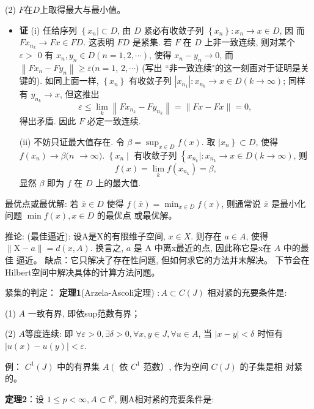 \documentclass[12pt,a4paper]{article}
\begin{document}
(2) $F$在$D$上取得最大与最小值。
\begin{itemize}
	\item []
	\textbf{证} (i) 任给序列 $\left\{x_{n} \mid \subset D\right.$, 由 $D$ 紧必有收敛子列 $\left\{x_{n}\right\}: x_{n} \rightarrow x \in D$, 因 而 $F x_{n_{k}} \rightarrow F x \in F D$. 这表明 $F D$ 是紧集. 若 $F$ 在 $D$ 上非一致连续, 则对某个 $\varepsilon>$ 0 有 $x_{n}, y_{n} \in D(n=1,2, \cdots)$, 使得 $x_{n}-y_{n} \rightarrow 0$, 而 $\left\|F x_{n}-F y_{n}\right\| \geqslant \varepsilon(n=1$, $2, \cdots)$ (写出 “非一致连续"的这一刻画对于证明是关键的). 如同上面一样, $\left\{x_{n}\right\}$ 有收敛子列 $\left|x_{n_{1}}\right|: x_{n_{k}} \rightarrow x \in D(k \rightarrow \infty)$; 同样有 $y_{n_{k}} \rightarrow x$, 但这推出
$$
\varepsilon \leqslant \lim _{k}\left\|F x_{n_{k}}-F y_{n_{k}}\right\|=\|F x-F x\|=0 \text {, }
$$
得出矛盾. 因此 $F$ 必定一致连续.

(ii) 不妨只证最大值存在. 令 $\beta=\sup _{x \in D} f(x)$. 取 $\left.\mid x_{n}\right\} \subset D$, 使得 $f\left(x_{n}\right) \rightarrow \beta(n$ $\rightarrow \infty)$. $\left\{x_{n} \mid\right.$ 有收敛子列 $\left\{x_{n_{k}} \mid: x_{n_{k}} \rightarrow x \in D(k \rightarrow \infty)\right.$, 则
$$
f(x)=\operatorname{lim}_{k}f\left(x_{n_{k}}\right)=\beta,
$$
显然 $\beta$ 即为 $f$ 在 $D$ 上的最大值.
\end{itemize}
 
 最优点或最优解: 若 $\bar{x} \in D$ 使得 $f(\bar{x})=\min _{x \in D} f(x)$, 则通常说 $\bar{x}$ 是最小化问题 $\min f(x), x \in D$ 的最优点 或最优解。
 
推论: (最佳逼近): 设A是X的有限维子空间, $x \in X$. 则存在 $a \in A$, 使得 $\|\mathrm{X}-a\|=d(x, A)$. 换言之, $a$ 是 $\mathrm{A}$ 中离x最近的点, 因此称它是x在 $A$ 中的最佳 逼近。 缺点：它只解决了存在性问题, 但如何求它的方法并末解决。 下节会在Hilbert空间中解决具体的计算方法问题。                  

紧集的判定：
\textbf{定理1}(Arzela-Ascoli定理) $: A \subset C(J)$ 相对紧的充要条件是:

(1) $A$ 一致有界, 即依sup范数有界；

(2) $A$等度连续: 即 $\forall \varepsilon>0, \exists \delta>0, \forall x, y \in J, \forall u \in A$, 当 $|x-y|<\delta$ 时恒有 $|u(x)-u(y)|<\varepsilon$.

例： $C^{1}(J)$ 中的有界集 $A\left(\right.$ 依 $C^{1}$ 范数）, 作为空间 $C(J)$ 的子集是相 对紧的。

\textbf{定理2}：设 $1 \leq p<\infty, A \subset l^{p}$, 则A相对紧的充要条件是:
\end{document}
